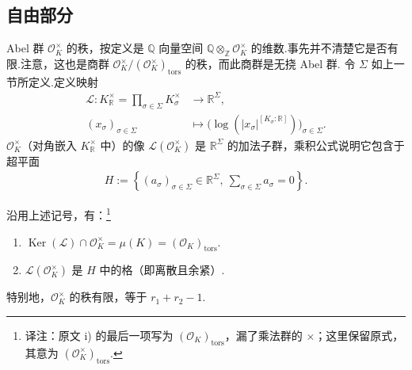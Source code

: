 \subsection{自由部分}\label{sec:nt-5-3-3}
Abel 群 $\mathcal O_K^\times$ 的秩，按定义是 $\mathbb Q$ 向量空间 $\mathbb Q\otimes_{\mathbb Z}\mathcal O_K^\times$ 的维数.事先并不清楚它是否有限.注意，这也是商群 $\mathcal O_K^\times/(\mathcal O_K^\times)_{\mathrm{tors}}$ 的秩，而此商群是无挠 Abel 群.
令 $\Sigma$ 如上一节所定义.定义映射
\begin{align*}
\mathcal L\colon K_{\mathbb R}^\times=\prod_{\sigma\in\Sigma}K_\sigma^\times&\longrightarrow\mathbb R^\Sigma,\\
(x_\sigma)_{\sigma\in\Sigma}&\longmapsto\bigl(\log(|x_\sigma|^{[K_\sigma:\mathbb R]})\bigr)_{\sigma\in\Sigma}.
\end{align*}
$\mathcal O_K^\times$（对角嵌入 $K_{\mathbb R}^\times$ 中）的像 $\mathcal L(\mathcal O_K^\times)$ 是 $\mathbb R^\Sigma$ 的加法子群，乘积公式说明它包含于超平面
\begin{align*}
H:=\left\{(a_\sigma)_{\sigma\in\Sigma}\in\mathbb R^\Sigma,\ \sum_{\sigma\in\Sigma}a_\sigma=0\right\}.
\end{align*}
\begin{theorem*}[Dirichlet]\label{thm:nt-dirichlet-units}
沿用上述记号，有：\footnote{译注：原文 i) 的最后一项写为 $(\mathcal O_K)_{\mathrm{tors}}$，漏了乘法群的 $\times$；这里保留原式，其意为 $(\mathcal O_K^\times)_{\mathrm{tors}}$.}
\begin{enumerate}[label=\roman*)]
\item $\operatorname{Ker}(\mathcal L)\cap\mathcal O_K^\times=\mu(K)=(\mathcal O_K)_{\mathrm{tors}}$.
\item $\mathcal L(\mathcal O_K^\times)$ 是 $H$ 中的格（即离散且余紧）.
\end{enumerate}
特别地，$\mathcal O_K^\times$ 的秩有限，等于 $r_1+r_2-1$.
\end{theorem*}
